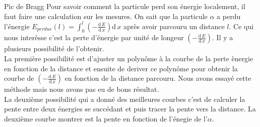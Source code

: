 \documentclass[a4paper,11pt,liststotocnumbered,bibtotocnumbered]{scrartcl}
\begin{document}
\newpage
 \begin{section}{Pic de Bragg}\label{Bragg}  Pour savoir comment la particule perd son énergie localement, il faut faire une calculation sur les mesures. On sait que la particule $\alpha$ a perdu l'énergie $E_{perdue}(l)=\int_0^l \left(-\frac{\text{d}\,E}{\text{d}\,x}\right) \text{d}\,x$ après avoir parcouru un distance $l$. Ce qui nous interèsse c'est la perte d'énergie par unité de longeur $\left(-\frac{\text{d}\,E}{\text{d}\,x}\right)$. Il y a plusieurs possibilité de l'obtenir.\\
 La première possibilité est d'ajuster un polynôme à la courbe de la perte ènergie en fonction de la distance et ensuite de deriver ce polynôme pour obtenir la courbe de $\left(-\frac{\text{d}\,E}{\text{d}\,x}\right)$ en fonction de la distance parcouru. Nous avons essayé cette méthode mais nous avons pas eu de bons résultat.\\ 
 La deuxième possibilité qui a donné des meilleures courbes c'est de calculer la pente entre deux énergies se succédant et puis tracer la pente vers la distance. La deuxième courbe montrer est la pente en fonction de l'énegie de l'$\alpha$. 


\end{section}
\end{document}
